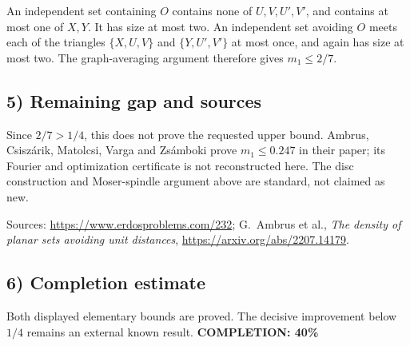 An independent set containing $O$ contains none of
$U,V,U',V'$, and contains at most one of $X,Y$. It has size at most
two. An independent set avoiding $O$ meets each of the triangles
$\{X,U,V\}$ and $\{Y,U',V'\}$ at most once, and again has size
at most two. The graph-averaging argument therefore gives $m_1\leq2/7$.

\subsection{5) Remaining gap and sources}
Since $2/7>1/4$, this does not prove the requested upper bound.
Ambrus, Csisz\'arik, Matolcsi, Varga and Zs\'amboki prove
$m_1\leq0.247$ in their paper; its Fourier and optimization
certificate is not reconstructed here. The disc construction and
Moser-spindle argument above are standard, not claimed as new.

Sources: \url{https://www.erdosproblems.com/232};
G.~Ambrus et al., \emph{The density of planar sets avoiding unit
distances}, \url{https://arxiv.org/abs/2207.14179}.

\subsection{6) Completion estimate}
Both displayed elementary bounds are proved. The decisive improvement
below $1/4$ remains an external known result.
\textbf{COMPLETION: 40\%}
